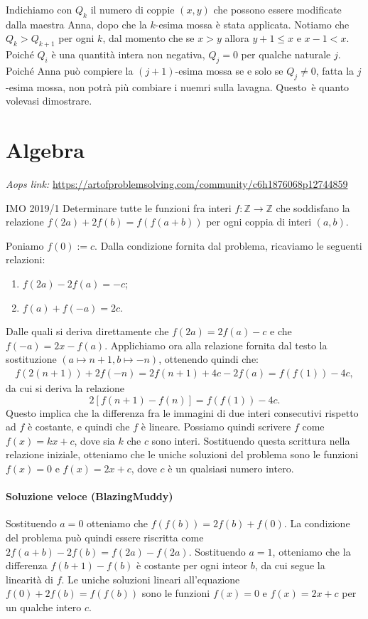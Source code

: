 \documentclass{article}
\begin{document}
Indichiamo con $Q_k$ il numero di coppie
$(x,y)$ che possono essere modificate dalla maestra Anna, dopo che la
$k$-esima mossa è stata applicata.
Notiamo che $Q_k>Q_{k+1}$ per ogni $k$, dal momento che se $x>y$ allora
$y+1\le x$ e $x-1<x$. Poiché $Q_i$ è una quantità intera non negativa,
$Q_j=0$ per qualche naturale $j$. Poiché Anna può compiere la $(j+1)$-esima
mossa se e solo se $Q_j\ne 0$, fatta la $j$-esima mossa,
non potrà più combiare i nuemri sulla lavagna. Questo è quanto volevasi
dimostrare.

\newpage

\section{Algebra}

\textit{Aops link:}
\href{https://artofproblemsolving.com/community/c6h1876068p12744859}
{https://artofproblemsolving.com/community/c6h1876068p12744859}

\begin{proposition}{IMO 2019/1}{}
	Determinare tutte le funzioni fra interi
	$f:\mathbb{Z}\rightarrow \mathbb{Z}$
	che soddisfano la relazione $f(2a)+2f(b)=f(f(a+b))$ per ogni coppia
	di interi $(a,b)$.
\end{proposition}

Poniamo $f(0):=c$.
Dalla condizione fornita dal problema, ricaviamo le seguenti relazioni:
\begin{enumerate}
	\item $f(2a)-2f(a)=-c$;
	\item $f(a)+f(-a)=2c$.
\end{enumerate}

Dalle quali si deriva direttamente che $f(2a)=2f(a)-c$ e che
$f(-a)=2x-f(a)$. Applichiamo ora alla relazione fornita dal
testo la sostituzione $(a\mapsto n+1,b\mapsto -n)$, ottenendo quindi che:
\begin{align*}
	f(2(n+1))+2f(-n)=2f(n+1)+4c-2f(a)
						 =f(f(1))-4c,
\end{align*}
da cui si deriva la relazione
\begin{equation*}
	2[f(n+1)-f(n)]=f(f(1))-4c.
\end{equation*}
Questo implica che la differenza fra le immagini di due interi
consecutivi rispetto ad $f$ è costante, e quindi che $f$ è lineare.
Possiamo quindi scrivere $f$ come $f(x)=kx+c$, dove sia $k$ che $c$
sono interi. Sostituendo questa scrittura nella relazione iniziale, 
otteniamo che le uniche soluzioni del problema sono le funzioni
$f(x)=0$ e $f(x)=2x+c$, dove $c$ è un qualsiasi numero intero.

\paragraph{Soluzione veloce (BlazingMuddy)}
Sostituendo $a=0$ otteniamo che $f(f(b))=2f(b)+f(0)$.
La condizione del problema può quindi essere riscritta come
$2f(a+b)-2f(b)=f(2a)-f(2a)$. Sostituendo $a=1$, otteniamo che
la differenza $f(b+1)-f(b)$ è costante per ogni inteor $b$, da
cui segue la linearità di $f$. Le uniche soluzioni
lineari all'equazione $f(0)+2f(b)=f(f(b))$ sono le funzioni
$f(x)=0$ e $f(x)=2x+c$ per un qualche intero $c$.
\end{document}
